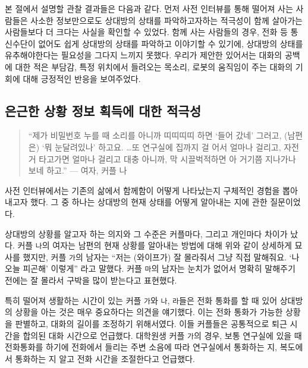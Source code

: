 본 절에서 설명할 관찰 결과들은 다음과 같다. 먼저 사전 인터뷰를 통해 떨어져 사는 사람들은 사소한 정보만으로도 상대방의 상태를 파악하고자하는 적극성이 함께 살아가는 사람들보다 더 크다는 사실을 확인할 수 있었다. 함께 사는 사람들의 경우, 전화 등 통신수단이 없어도 쉽게 상대방의 상태를 파악하고 이야기할 수 있기에, 상대방의 상태를 유추해야한다는 필요성을 그다지 느끼지 못했다. 우리가 제안한  있어서는 대화의 공백에 대한 적은 부담감, 특정 위치에서 들려오는 목소리, 로봇의 움직임이 주는 대화의 기회에 대해 긍정적인 반응을 보여주었다.



\subsection{은근한 상황 정보 획득에 대한 적극성}

\begin{quote}
``제가 비밀번호 누를 때 소리를 아니까 띠띠띠띠 하면 `들어 갔네' 그러고, (남편은) `뭐 눈달려있나' 하고요. \ldots 또 연구실에 집까지 걸 어서 얼마나 걸리고, 자전거 타고가면 얼마나 걸리고 대충 아니까, 막 시끌벅적하면 아 거기쯤 지나가나 보네 하고.'' --- 여자, 커플 나
\end{quote}

사전 인터뷰에서는 기존의 삶에서 함께함이 어떻게 나타났는지 구체적인 경험을 뽑아내고자 했다. 그 중 하나는 상대방의 현재 상태를 어떻게 알아내는 지에 관한 질문이었다.

상대방의 상황를 알고자 하는 의지와 그 수준은 커플마다, 그리고 개인마다 차이가 났다. 커플 \texttt{나}의 여자는 남편의 현재 상황를 알아내는 방법에 대해 위와 같이 상세하게 묘사를 했지만, 커플 \texttt{가}의 남자는 ``저는 (와이프가) 잘 몰라줘서 그냥 직접 말해줘요. `나 오늘 피곤해' 이렇게'' 라고 말했다. 커플 \texttt{마}의 남자는 눈치가 없어서 명확히 말해주기 전에는 잘 몰라서 구박을 많이 받는다고 표현했다.

특히 떨어져 생활하는 시간이 있는 커플 \texttt{가}와 \texttt{나}, \texttt{라}들은 전화 통화를 할 때 있어 상대방의 상황을 아는 것은 매우 중요하다는 의견을 얘기했다. 이는 전화 통화가 가능한 상황을 판별하고, 대화의 길이를 조정하기 위해서였다. 이들 커플들은 공통적으로 퇴근 시간을 합의된 대화 시간으로 언급했다. 대학원생 커플 \texttt{가}의 경우, 보통 연구실에 있을 때 전화통화를 하기에 전화에서 들리는 주변 소음에 따라 연구실에서 통화하는 지, 복도에서 통화하는 지 알고 전화 시간을 조절한다고 언급했다.

